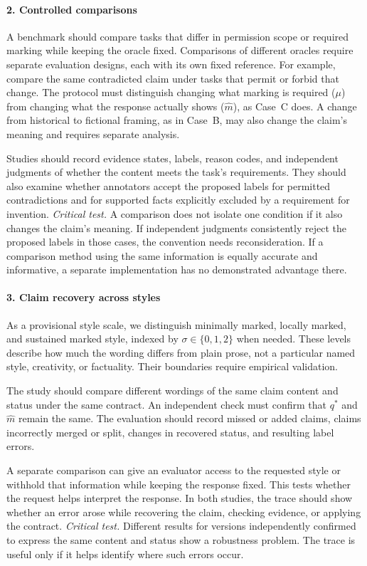 \documentclass{clv2025}
\begin{document}
\paragraph{2. Controlled comparisons}
A benchmark should compare tasks that differ in permission scope or required
marking while keeping the oracle fixed. Comparisons of different oracles
require separate evaluation designs, each with its own fixed reference.
For example, compare the same contradicted claim under tasks that permit
or forbid that change. The protocol must distinguish changing what marking
is required ($\mu$) from changing what the response actually shows
($\widehat{m}$), as Case~C does. A change from historical to fictional framing,
as in Case~B, may also change the claim's meaning and requires separate analysis.

Studies should record evidence states, labels, reason codes, and independent
judgments of whether the content meets the task's requirements. They should
also examine whether annotators accept the proposed labels for permitted
contradictions and for supported facts explicitly excluded by a requirement
for invention.
\emph{Critical test.} A comparison does not isolate one condition if it also
changes the claim's meaning. If independent judgments consistently reject
the proposed labels in those cases, the convention needs reconsideration.
If a comparison method using the same information is equally accurate and
informative, a separate implementation has no demonstrated advantage there.

\paragraph{3. Claim recovery across styles}\label{par:style-scale}
As a provisional style scale, we distinguish minimally marked, locally
marked, and sustained marked style, indexed by $\sigma\in\{0,1,2\}$ when
needed. These levels describe how much the wording differs from plain prose,
not a particular named style, creativity, or factuality. Their boundaries
require empirical validation.

The study should compare different wordings of the same claim content and
status under the same contract. An independent check must confirm that
$q^*$ and $\widehat{m}$ remain the same. The evaluation should record missed
or added claims, claims incorrectly merged or split, changes in recovered
status, and resulting label errors.

A separate comparison can give an evaluator access to the requested style
or withhold that information while keeping the response fixed. This tests
whether the request helps interpret the response. In both studies, the trace
should show whether an error arose while recovering the claim, checking
evidence, or applying the contract.
\emph{Critical test.} Different results for versions independently confirmed
to express the same content and status show a robustness problem. The trace
is useful only if it helps identify where such errors occur.
\end{document}
